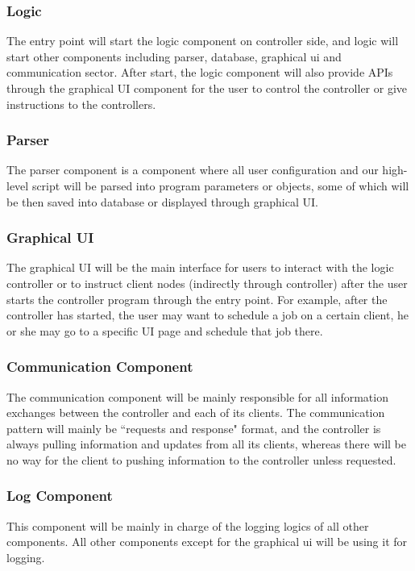 \documentclass[12pt]{report}
\begin{document}
\subsubsection{Logic}
The entry point will start the logic component on controller side, and logic will start other components including parser, database, graphical ui and communication sector. After start, the logic component will also provide APIs through the graphical UI component for the user to control the controller or give instructions to the controllers.

\subsubsection{Parser}
The parser component is a component where all user configuration and our high-level script will be parsed into program parameters or objects, some of which will be then saved into database or displayed through graphical UI.

\subsubsection{Graphical UI}
The graphical UI will be the main interface for users to interact with the logic controller or to instruct client nodes (indirectly through controller) after the user starts the controller program through the entry point. For example, after the controller has started, the user may want to schedule a job on a certain client, he or she may go to a specific UI page and schedule that job there.

\subsubsection{Communication Component}
The communication component will be mainly responsible for all information exchanges between the controller and each of its clients. The communication pattern will mainly be ``requests and response" format, and the controller is always pulling information and updates from all its clients, whereas there will be no way for the client to pushing information to the controller unless requested.

\subsubsection{Log Component}
This component will be mainly in charge of the logging logics of all other components. All other components except for the graphical ui will be using it for logging.
\end{document}
